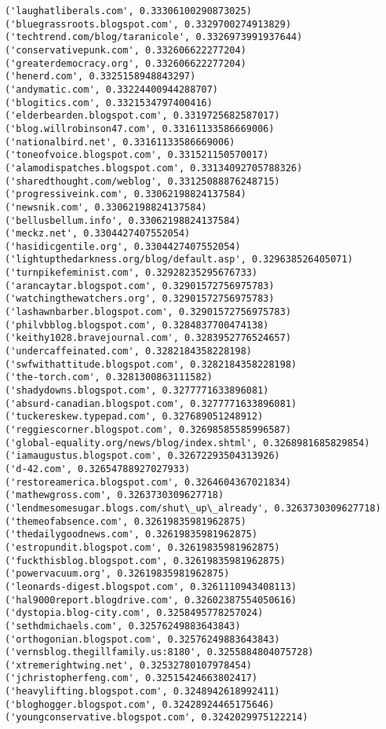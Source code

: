 \documentclass[11pt]{article}
\begin{document}
\begin{Verbatim}[commandchars=\\\{\}]
('laughatliberals.com', 0.33306100290873025)
('bluegrassroots.blogspot.com', 0.3329700274913829)
('techtrend.com/blog/taranicole', 0.3326973991937644)
('conservativepunk.com', 0.332606622277204)
('greaterdemocracy.org', 0.332606622277204)
('henerd.com', 0.3325158948843297)
('andymatic.com', 0.33224400944288707)
('blogitics.com', 0.3321534797400416)
('elderbearden.blogspot.com', 0.3319725682587017)
('blog.willrobinson47.com', 0.33161133586669006)
('nationalbird.net', 0.33161133586669006)
('toneofvoice.blogspot.com', 0.331521150570017)
('alamodispatches.blogspot.com', 0.33134092705788326)
('sharedthought.com/weblog', 0.33125088876248715)
('progressiveink.com', 0.33062198824137584)
('newsnik.com', 0.33062198824137584)
('bellusbellum.info', 0.33062198824137584)
('meckz.net', 0.3304427407552054)
('hasidicgentile.org', 0.3304427407552054)
('lightupthedarkness.org/blog/default.asp', 0.329638526405071)
('turnpikefeminist.com', 0.32928235295676733)
('arancaytar.blogspot.com', 0.32901572756975783)
('watchingthewatchers.org', 0.32901572756975783)
('lashawnbarber.blogspot.com', 0.32901572756975783)
('philvbblog.blogspot.com', 0.3284837700474138)
('keithy1028.bravejournal.com', 0.3283952776524657)
('undercaffeinated.com', 0.3282184358228198)
('swfwithattitude.blogspot.com', 0.3282184358228198)
('the-torch.com', 0.3281300863111582)
('shadydowns.blogspot.com', 0.3277771633896081)
('absurd-canadian.blogspot.com', 0.3277771633896081)
('tuckereskew.typepad.com', 0.327689051248912)
('reggiescorner.blogspot.com', 0.32698585585996587)
('global-equality.org/news/blog/index.shtml', 0.3268981685829854)
('iamaugustus.blogspot.com', 0.32672293504313926)
('d-42.com', 0.32654788927027933)
('restoreamerica.blogspot.com', 0.3264604367021834)
('mathewgross.com', 0.3263730309627718)
('lendmesomesugar.blogs.com/shut\_up\_already', 0.3263730309627718)
('themeofabsence.com', 0.32619835981962875)
('thedailygoodnews.com', 0.32619835981962875)
('estropundit.blogspot.com', 0.32619835981962875)
('fuckthisblog.blogspot.com', 0.32619835981962875)
('powervacuum.org', 0.32619835981962875)
('leonards-digest.blogspot.com', 0.3261110943408113)
('hal9000report.blogdrive.com', 0.32602387554050616)
('dystopia.blog-city.com', 0.3258495778257024)
('sethdmichaels.com', 0.32576249883643843)
('orthogonian.blogspot.com', 0.32576249883643843)
('vernsblog.thegillfamily.us:8180', 0.3255884804075728)
('xtremerightwing.net', 0.32532780107978454)
('jchristopherfeng.com', 0.32515424663802417)
('heavylifting.blogspot.com', 0.3248942618992411)
('bloghogger.blogspot.com', 0.32428924465175646)
('youngconservative.blogspot.com', 0.3242029975122214)

\end{Verbatim}
\end{document}
